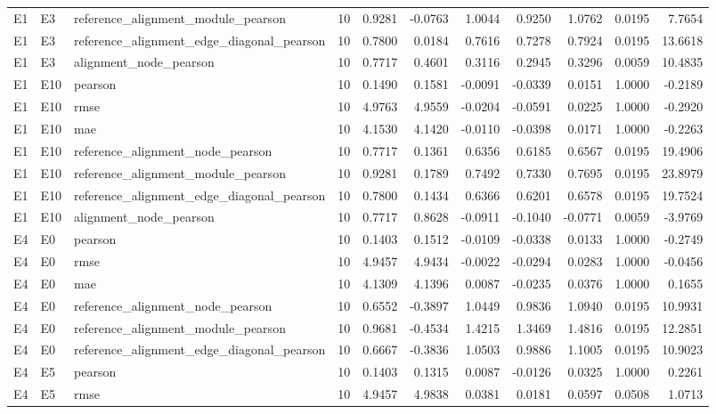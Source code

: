 \begin{tabular}{lllrrrrrrrr}
E1 & E3 & reference_alignment_module_pearson & 10 & 0.9281 & -0.0763 & 1.0044 & 0.9250 & 1.0762 & 0.0195 & 7.7654 \\
E1 & E3 & reference_alignment_edge_diagonal_pearson & 10 & 0.7800 & 0.0184 & 0.7616 & 0.7278 & 0.7924 & 0.0195 & 13.6618 \\
E1 & E3 & alignment_node_pearson & 10 & 0.7717 & 0.4601 & 0.3116 & 0.2945 & 0.3296 & 0.0059 & 10.4835 \\
E1 & E10 & pearson & 10 & 0.1490 & 0.1581 & -0.0091 & -0.0339 & 0.0151 & 1.0000 & -0.2189 \\
E1 & E10 & rmse & 10 & 4.9763 & 4.9559 & -0.0204 & -0.0591 & 0.0225 & 1.0000 & -0.2920 \\
E1 & E10 & mae & 10 & 4.1530 & 4.1420 & -0.0110 & -0.0398 & 0.0171 & 1.0000 & -0.2263 \\
E1 & E10 & reference_alignment_node_pearson & 10 & 0.7717 & 0.1361 & 0.6356 & 0.6185 & 0.6567 & 0.0195 & 19.4906 \\
E1 & E10 & reference_alignment_module_pearson & 10 & 0.9281 & 0.1789 & 0.7492 & 0.7330 & 0.7695 & 0.0195 & 23.8979 \\
E1 & E10 & reference_alignment_edge_diagonal_pearson & 10 & 0.7800 & 0.1434 & 0.6366 & 0.6201 & 0.6578 & 0.0195 & 19.7524 \\
E1 & E10 & alignment_node_pearson & 10 & 0.7717 & 0.8628 & -0.0911 & -0.1040 & -0.0771 & 0.0059 & -3.9769 \\
E4 & E0 & pearson & 10 & 0.1403 & 0.1512 & -0.0109 & -0.0338 & 0.0133 & 1.0000 & -0.2749 \\
E4 & E0 & rmse & 10 & 4.9457 & 4.9434 & -0.0022 & -0.0294 & 0.0283 & 1.0000 & -0.0456 \\
E4 & E0 & mae & 10 & 4.1309 & 4.1396 & 0.0087 & -0.0235 & 0.0376 & 1.0000 & 0.1655 \\
E4 & E0 & reference_alignment_node_pearson & 10 & 0.6552 & -0.3897 & 1.0449 & 0.9836 & 1.0940 & 0.0195 & 10.9931 \\
E4 & E0 & reference_alignment_module_pearson & 10 & 0.9681 & -0.4534 & 1.4215 & 1.3469 & 1.4816 & 0.0195 & 12.2851 \\
E4 & E0 & reference_alignment_edge_diagonal_pearson & 10 & 0.6667 & -0.3836 & 1.0503 & 0.9886 & 1.1005 & 0.0195 & 10.9023 \\
E4 & E5 & pearson & 10 & 0.1403 & 0.1315 & 0.0087 & -0.0126 & 0.0325 & 1.0000 & 0.2261 \\
E4 & E5 & rmse & 10 & 4.9457 & 4.9838 & 0.0381 & 0.0181 & 0.0597 & 0.0508 & 1.0713 \\

\end{tabular}
